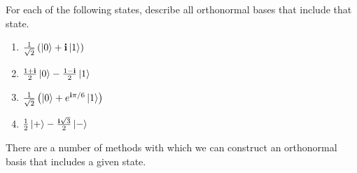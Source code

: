\section{}

For each of the following states, describe all orthonormal bases that include that state.
\begin{enumerate}[label=\alph*.,ref={Ex.~\thesection\alph*}]
\label{ex:2p7}
    \item $\tfrac{1}{\sqrt{2}} \left ( \ket{0} + \mathbf{i} \ket{1} \right )$
    \item $\tfrac{1 + \mathbf{i}}{2} \ket{0} - \tfrac{1 - \mathbf{i}}{2} \ket{1}$
    \item $\tfrac{1}{\sqrt{2}} \left ( \ket{0} + e^{\mathbf{i} \pi / 6} \ket{1} \right )$
    \item $\tfrac{1}{2} \ket{+} - \tfrac{\mathbf{i} \sqrt{3}}{2} \ket{-}$
\end{enumerate}

{\Sol}
There are a number of methods with which we can construct an orthonormal basis that
includes a given state.

